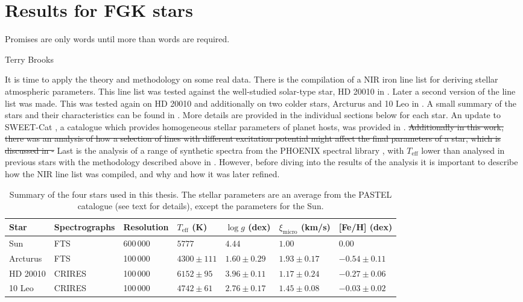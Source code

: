 
\chapter{Results for FGK stars}
\label{cha:results}
\epigraph{Promises are only words until more than words are required.}{Terry Brooks}

It is time to apply the theory and methodology on some real data. There is the compilation of a NIR
iron line list for deriving stellar atmospheric parameters. This line list was tested against the
well-studied solar-type star, HD 20010 in \citet{Andreasen2016}. Later a second version of the line
list was made. This was tested again on HD 20010 and additionally on two colder stars, Arcturus and
10 Leo in \citet{Andreasen2017b}. A small summary of the stars and their characteristics can be
found in . More details are provided in the individual sections below for each star.
An update to SWEET-Cat \citep{Santos2013}, a catalogue which provides homogeneous stellar parameters
of planet hosts, was provided in \citet{Andreasen2017a}. \st{Additionally in this work, there was an
analysis of how a selection of lines with different excitation potential might affect the final
parameters of a star, which is discussed in -} Last is the analysis of a range of
synthetic spectra from the PHOENIX spectral library \citep{Husser2013}, with $T_\mathrm{eff}$ lower
than analysed in previous stars with the methodology described above in .
However, before diving into the results of the analysis it is important to describe how the NIR line
list was compiled, and why and how it was later refined.

\begin{table}[htb!]
    \caption{Summary of the four stars used in this thesis. The stellar parameters are an average
             from the PASTEL catalogue \citep{Soubiran2016} (see text for details), except the
             parameters for the Sun.}
    \label{tab:stars}
    \centering
    \begin{tabular}{lllllll}
      \hline\hline
        Star        & Spectrographs  & Resolution  & $T_\mathrm{eff}$ (K) &  $\log g$ (dex)  &   $\xi_\mathrm{micro}$ (km/s)   & [Fe/H] (dex)      \\
      \hline
        Sun         & FTS            & 600\,000    & $5777$               &  $4.44$          &    $1.00$                       & $ 0.00$          \\
        Arcturus    & FTS            & 100\,000    & $4300 \pm 111$       &  $1.60 \pm 0.29$ &    $1.93 \pm 0.17$              & $-0.54 \pm 0.11$ \\
        HD 20010    & CRIRES         & 100\,000    & $6152 \pm  95$       &  $3.96 \pm 0.11$ &    $1.17 \pm 0.24$              & $-0.27 \pm 0.06$ \\
        10 Leo      & CRIRES         & 100\,000    & $4742 \pm  61$       &  $2.76 \pm 0.17$ &    $1.45 \pm 0.08$              & $-0.03 \pm 0.02$ \\
      \hline
    \end{tabular}
\end{table}

